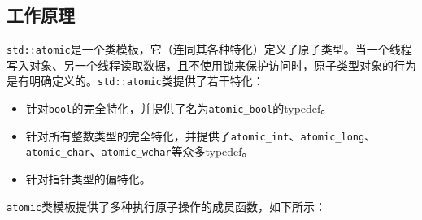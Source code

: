 
\subsection{工作原理}



\texttt{std::\allowbreak{}atomic}是一个类模板，它（连同其各种特化）定义了原子类型。当一个线程写入对象、另一个线程读取数据，且不使用锁来保护访问时，原子类型对象的行为是有明确定义的。\texttt{std::\allowbreak{}atomic}类提供了若干特化：



\begin{itemize}
\item 针对\texttt{bool}的完全特化，并提供了名为\texttt{atomic\_\allowbreak{}bool}的typedef。



\item 针对所有整数类型的完全特化，并提供了\texttt{atomic\_\allowbreak{}int}、\texttt{atomic\_\allowbreak{}long}、\texttt{atomic\_\allowbreak{}char}、\texttt{atomic\_\allowbreak{}wchar}等众多typedef。



\item 针对指针类型的偏特化。

\end{itemize}



\texttt{atomic}类模板提供了多种执行原子操作的成员函数，如下所示：



